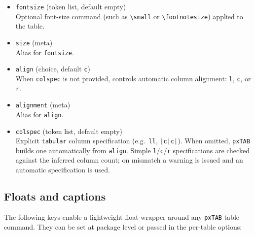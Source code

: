 \documentclass[11pt,a4paper]{article}
\begin{document}
\begin{itemize}
  \item \texttt{fontsize} (token list, default empty)\\
    Optional font-size command (such as \verb|\small| or \verb|\footnotesize|)
    applied to the table.

  \item \texttt{size} (meta)\\
    Alias for \texttt{fontsize}.

  \item \texttt{align} (choice, default \texttt{c})\\
    When \texttt{colspec} is not provided, controls automatic column
    alignment: \texttt{l}, \texttt{c}, or \texttt{r}.

  \item \texttt{alignment} (meta)\\
    Alias for \texttt{align}.

  \item \texttt{colspec} (token list, default empty)\\
    Explicit \texttt{tabular} column specification (e.g.\ \texttt{ll},
    \texttt{|c|c|}).  When omitted, \texttt{pxTAB} builds one
    automatically from \texttt{align}.  Simple \texttt{l}/\texttt{c}/\texttt{r}
    specifications are checked against the inferred column count; on
    mismatch a warning is issued and an automatic specification is used.

\end{itemize}

\subsection*{Floats and captions}

The following keys enable a lightweight float wrapper around any
\texttt{pxTAB} table command.  They can be set at package level or
passed in the per-table options:
\end{document}
